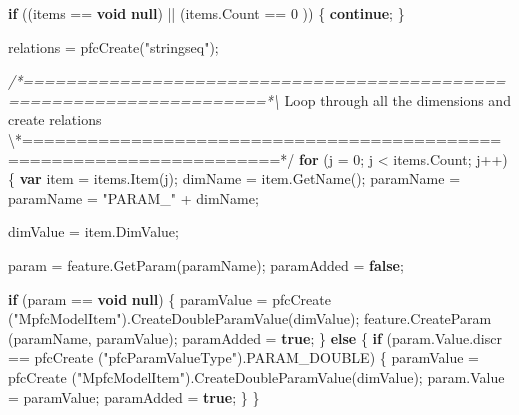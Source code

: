 \documentclass[]{article}
\newenvironment{Shaded}{}{}
\newcommand{\KeywordTok}[1]{\textcolor[rgb]{0.00,0.44,0.13}{\textbf{{#1}}}}
\newcommand{\DecValTok}[1]{\textcolor[rgb]{0.25,0.63,0.44}{{#1}}}
\newcommand{\StringTok}[1]{\textcolor[rgb]{0.25,0.44,0.63}{{#1}}}
\newcommand{\CommentTok}[1]{\textcolor[rgb]{0.38,0.63,0.69}{\textit{{#1}}}}
\newcommand{\OtherTok}[1]{\textcolor[rgb]{0.00,0.44,0.13}{{#1}}}
\newcommand{\FunctionTok}[1]{\textcolor[rgb]{0.02,0.16,0.49}{{#1}}}
\newcommand{\NormalTok}[1]{{#1}}
\begin{document}
\begin{Shaded}
\begin{Highlighting}[]
      \KeywordTok{if} \NormalTok{((items == }\KeywordTok{void} \KeywordTok{null}\NormalTok{) || (}\OtherTok{items}\NormalTok{.}\FunctionTok{Count} \NormalTok{== }\DecValTok{0} \NormalTok{))}
      \NormalTok{\{}
          \KeywordTok{continue}\NormalTok{;}
      \NormalTok{\}}
              
      \NormalTok{relations = }\FunctionTok{pfcCreate}\NormalTok{(}\StringTok{"stringseq"}\NormalTok{);}
            
      \CommentTok{/*=====================================================================*\textbackslash{}}
        \NormalTok{Loop through all the dimensions and create relations}
      \NormalTok{\textbackslash{}*=====================================================================*}\OtherTok{/}
      \KeywordTok{for} \NormalTok{(j = }\DecValTok{0}\NormalTok{; j < }\OtherTok{items}\NormalTok{.}\FunctionTok{Count}\NormalTok{; j++)}
      \NormalTok{\{       }
          \KeywordTok{var} \NormalTok{item = }\OtherTok{items}\NormalTok{.}\FunctionTok{Item}\NormalTok{(j);       }
          \NormalTok{dimName = }\OtherTok{item}\NormalTok{.}\FunctionTok{GetName}\NormalTok{();       }
          \NormalTok{paramName = paramName = }\StringTok{"PARAM_"} \NormalTok{+ dimName;         }

          \NormalTok{dimValue = }\OtherTok{item}\NormalTok{.}\FunctionTok{DimValue}\NormalTok{;}
                          
          \NormalTok{param = }\OtherTok{feature}\NormalTok{.}\FunctionTok{GetParam}\NormalTok{(paramName);        }
          \NormalTok{paramAdded = }\KeywordTok{false}\NormalTok{;}
          
          \KeywordTok{if} \NormalTok{(param == }\KeywordTok{void} \KeywordTok{null}\NormalTok{)}
          \NormalTok{\{}
              \NormalTok{paramValue = }\FunctionTok{pfcCreate} \NormalTok{(}\StringTok{"MpfcModelItem"}\NormalTok{).}\FunctionTok{CreateDoubleParamValue}\NormalTok{(dimValue);}
              \OtherTok{feature}\NormalTok{.}\FunctionTok{CreateParam} \NormalTok{(paramName, paramValue);}
              \NormalTok{paramAdded = }\KeywordTok{true}\NormalTok{;}
          \NormalTok{\}}
          \KeywordTok{else}
          \NormalTok{\{}
              \KeywordTok{if} \NormalTok{(}\OtherTok{param}\NormalTok{.}\OtherTok{Value}\NormalTok{.}\FunctionTok{discr} \NormalTok{== }\FunctionTok{pfcCreate} \NormalTok{(}\StringTok{"pfcParamValueType"}\NormalTok{).}\FunctionTok{PARAM_DOUBLE}\NormalTok{)}
              \NormalTok{\{}
                  \NormalTok{paramValue = }\FunctionTok{pfcCreate} \NormalTok{(}\StringTok{"MpfcModelItem"}\NormalTok{).}\FunctionTok{CreateDoubleParamValue}\NormalTok{(dimValue);}
                  \OtherTok{param}\NormalTok{.}\FunctionTok{Value} \NormalTok{= paramValue;}
                  \NormalTok{paramAdded = }\KeywordTok{true}\NormalTok{;}
              \NormalTok{\}}
          \NormalTok{\}}
          

\end{Highlighting}
\end{Shaded}
\end{document}
